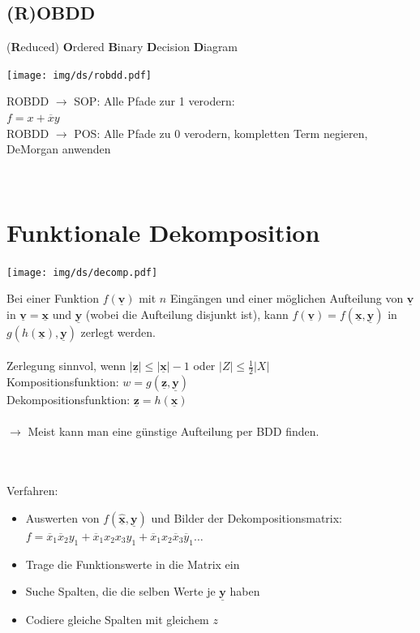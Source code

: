 \documentclass[6pt,a4paper]{scrartcl}
\renewcommand{\vec}[1]{\ensuremath{\underline{\boldsymbol {#1}}}}
\newcommand{\abs}[1]{\ensuremath{\left\vert#1\right\vert}} 							%
\newcommand{\ra}[0]{\ensuremath{\rightarrow}} 									%
\renewcommand{\vec}[1]{\ensuremath{\underline{\boldsymbol {#1}}}}
\begin{document}
\begin{multicols}{3}
	\subsection{(R)OBDD}
	(\textbf{R}educed) \textbf{O}rdered \textbf{B}inary \textbf{D}ecision \textbf{D}iagram\\
	\parbox{2.0cm}{ \texttt{[image: img/ds/robdd.pdf]} }
	\parbox{5.0cm}{ ROBDD $\rightarrow$ SOP: Alle Pfade zur 1 verodern:\\ $f = x + \overline xy$ \\ 
					ROBDD $ \ra$ POS: Alle Pfade zu 0 verodern, kompletten Term negieren, DeMorgan anwenden} \\
	


\section{Funktionale Dekomposition} %
\label{sub:Funktionale Dekomposition}
\parbox{2.7cm}{ \texttt{[image: img/ds/decomp.pdf]} }
\parbox{6.0cm}{
Bei einer Funktion $f(\vec v)$ mit $n$ Eingängen und einer möglichen Aufteilung von $\vec v$ in $\vec v = \vec x$ und $\vec y$ (wobei die Aufteilung disjunkt ist), kann $f(\vec v) = f(\vec x, \vec y)$ in $g(h(\vec x), \vec y)$ zerlegt werden. \\
\\
Zerlegung sinnvol, wenn $\abs{\vec z} \le \abs{\vec x} -1$ oder $\abs{Z} \le \frac{1}{2} \abs{X}$ \\
Kompositionsfunktion: $w = g(\vec z, \vec y)$ \\
Dekompositionsfunktion: $\vec z = h(\vec x)$ \\
\\
$\ra $ Meist kann man eine günstige Aufteilung per BDD finden. }\\
\\
Verfahren:
\begin{itemize}
	\item Auswerten von $f(\vec{\hat x}, \vec y)$ und Bilder der Dekompositionsmatrix: \\
		$f = \overline x_1\overline x_2 y_1 + \overline x_1  x_2  x_3  y_1 + \overline x_1  x_2 \overline x_3  \overline y_1 \ldots$
	\item Trage die Funktionswerte in die Matrix ein
	\item Suche Spalten, die die selben Werte je $\vec y$ haben
	\item Codiere gleiche Spalten mit gleichem $z$
\end{itemize}

\end{multicols}
\end{document}

